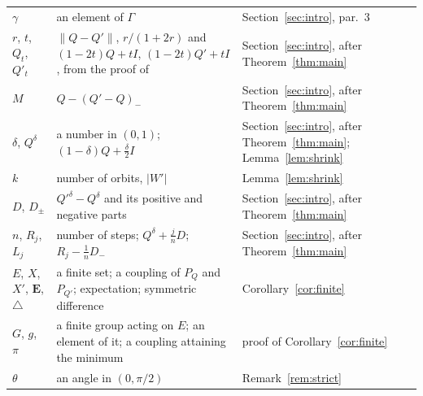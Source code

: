 \documentclass[11pt]{amsart}
\theoremstyle{remark}
\numberwithin{equation}{section}
\begin{document}
\begin{center}
\begin{tabular}{p{}p{}p{}}
$\gamma$ & an element of $\Gamma$ & Section~\ref{sec:intro}, par.~3\\
$r$, $t$, $Q_t$, $Q'_t$ & $\|Q-Q'\|$, $r/(1+2r)$ and $(1-2t)Q+tI$, $(1-2t)Q'+tI$, from the proof of \cite[Lemma~7.8]{LT16} & Section~\ref{sec:intro}, after Theorem~\ref{thm:main}\\
$M$ & $Q-(Q'-Q)_-$ & Section~\ref{sec:intro}, after Theorem~\ref{thm:main}\\
$\delta$, $Q^\delta$ & a number in $(0,1)$; $(1-\delta)Q+\frac\delta2 I$ & Section~\ref{sec:intro}, after Theorem~\ref{thm:main}; Lemma~\ref{lem:shrink}\\
$k$ & number of orbits, $|W'|$ & Lemma~\ref{lem:shrink}\\
$D$, $D_\pm$ & $Q'^\delta-Q^\delta$ and its positive and negative parts & Section~\ref{sec:intro}, after Theorem~\ref{thm:main}\\
$n$, $R_j$, $L_j$ & number of steps; $Q^\delta+\frac jnD$; $R_j-\frac1nD_-$ & Section~\ref{sec:intro}, after Theorem~\ref{thm:main}\\
$E$, $X$, $X'$, $\mathbf E$, $\triangle$ & a finite set; a coupling of $P_Q$ and $P_{Q'}$; expectation; symmetric difference & Corollary~\ref{cor:finite}\\
$G$, $g$, $\pi$ & a finite group acting on $E$; an element of it; a coupling attaining the minimum & proof of Corollary~\ref{cor:finite}\\
$\theta$ & an angle in $(0,\pi/2)$ & Remark~\ref{rem:strict}\\\bottomrule
\end{tabular}
\end{center}
\end{document}

